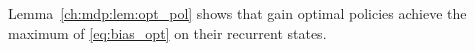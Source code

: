Lemma~\ref{ch:mdp:lem:opt_pol} shows that gain optimal policies achieve the maximum of \eqref{eq:bias_opt} on their recurrent states.


